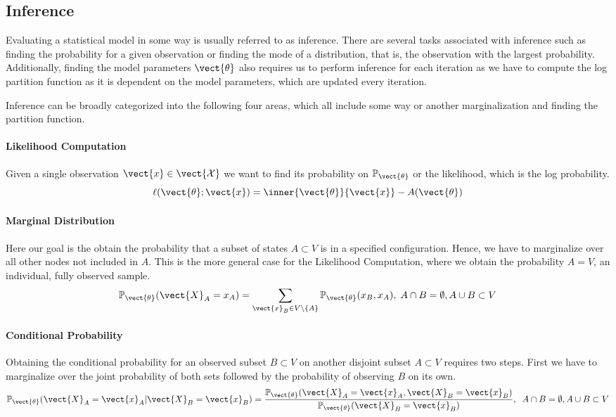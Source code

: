 \subsection{Inference}
\label{ssec:inf}
Evaluating a statistical model in some way is usually referred to as inference.
There are several tasks associated with inference such as finding the probability for a given observation or finding the mode of a distribution, that is, the observation with the largest probability.
Additionally, finding the model parameters $\vect{\theta}$ also requires us to perform inference for each iteration as we have to compute the log partition function as it is dependent on the model parameters, which are updated every iteration.

Inference can be broadly categorized into the following four areas, which all include some way or another marginalization and finding the partition function.

\paragraph*{Likelihood Computation}
Given a single observation $\vect{x} \in \vect{\mathcal{X}}$ we want to find its probability on $\mathbb{P}_{\vect{\theta}}$ or the likelihood, which is the log probability.
\begin{equation}
    \ell(\vect{\theta}; \vect{x}) = \inner{\vect{\theta}}{\vect{x}} - A(\vect{\theta})
\end{equation}

\paragraph*{Marginal Distribution}
Here our goal is the obtain the probability that a subset of states $A \subset V$ is in a specified configuration.
Hence, we have to marginalize over all other nodes not included in $A$. 
This is the more general case for the Likelihood Computation, where we obtain the probability $A = V$, an individual, fully observed sample.
    \begin{equation}
        \mathbb{P}_{\vect{\theta}}(\vect{X}_A = x_A) = \sum_{\vect{x}_B \in V \setminus\{A\}} \mathbb{P}_{\vect{\theta}}(x_B , x_A), \; A \cap B = \emptyset, A \cup B \subset V
    \end{equation}

\paragraph*{Conditional Probability}
Obtaining the conditional probability for an observed subset $B \subset V$ on another disjoint subset $A \subset V$ requires two steps. First we have to marginalize over the joint probability of both sets followed by the probability of observing $B$ on its own.
    \begin{equation}
        \mathbb{P}_{\vect{\theta}}(\vect{X}_A = \vect{x}_A \lvert \vect{X}_B = \vect{x}_B) = \frac{\mathbb{P}_{\vect{\theta}}(\vect{X}_A = \vect{x}_A , \vect{X}_B = \vect{x}_B)}{\mathbb{P}_{\vect{\theta}}(\vect{X}_B = \vect{x}_B)}, \;\; A \cap B = \emptyset, A \cup B \subset V
    \end{equation}

